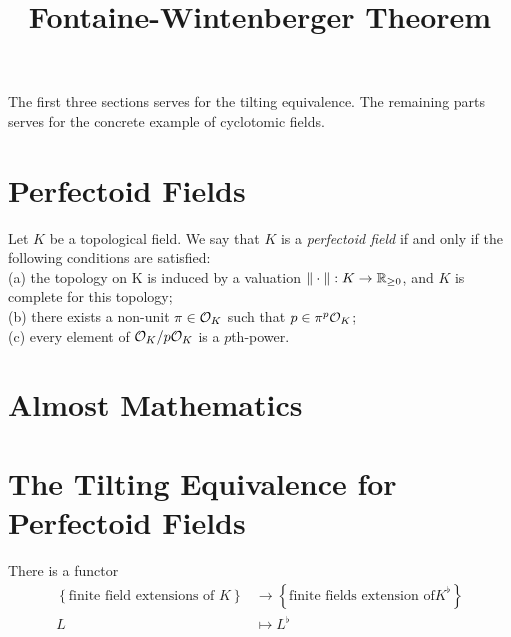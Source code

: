 \title{Fontaine-Wintenberger Theorem}




\maketitle


\tableofcontents

The first three sections serves for the tilting equivalence. The remaining parts serves for the concrete example of cyclotomic fields.

\section{Perfectoid Fields}

\begin{definition}
    \label{Perfectoid Field}

    Let $K$ be a topological field. We say that $K$ is a \emph{perfectoid field} if and only if the following conditions are satisfied:\\
    (a) the topology on K is induced by a valuation $\| \cdot \| : K \to \mathbb{R}_{\ge0}$, and $K$ is complete for this topology;\\
    (b) there exists a non-unit $\pi \in \mathcal{O}_K$ such that $p \in \pi^p \mathcal{O}_K$;\\
    (c) every element of $\mathcal{O}_K/p\mathcal{O}_K$ is a $p$th-power.
\end{definition}



\section{Almost Mathematics}

\section{The Tilting Equivalence for Perfectoid Fields}

\begin{definition}
    \label{Tilting Functor (Finite Extension)}
    \notready

    There is a functor 
    \begin{align*}
        \left \{ \text{finite field extensions of } K \right \} & \to \left \{ \text{finite fields extension of} K^\flat \right \} \\
        L & \mapsto L^\flat
    \end{align*}

\end{definition}

